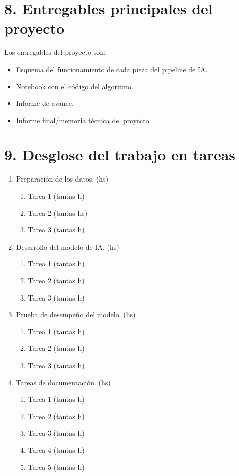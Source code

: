 \documentclass[
11pt, %
codirector, %
]{charter}
\begin{document}
\section{8. Entregables principales del proyecto}
\label{sec:entregables}

Los entregables del proyecto son:

\begin{itemize}
	\item Esquema del funcionamiento de cada pieza del pipeline de IA.
	\item Notebook con el código del algoritmo.
	\item Informe de avance.
	\item Informe final/memoria técnica del proyecto
\end{itemize}

\section{9. Desglose del trabajo en tareas}
\label{sec:wbs}

\begin{enumerate}
\item Preparación de los datos. (hs)
	\begin{enumerate}
	\item Tarea 1 (tantas h)
	\item Tarea 2 (tantas hs)
	\item Tarea 3 (tantas h)
	\end{enumerate}
\item Desarrollo del modelo de IA. (hs)
	\begin{enumerate}
	\item Tarea 1 (tantas h)
	\item Tarea 2 (tantas h)
	\item Tarea 3 (tantas h)
	\end{enumerate}
\item Prueba de desempeño del modelo. (hs)
	\begin{enumerate}
	\item Tarea 1 (tantas h)
	\item Tarea 2 (tantas h)
	\item Tarea 3 (tantas h)
	\end{enumerate}
\item Tareas de documentación. (hs)
	\begin{enumerate}
	\item Tarea 1 (tantas h)
	\item Tarea 2 (tantas h)
	\item Tarea 3 (tantas h)
	\item Tarea 4 (tantas h)
	\item Tarea 5 (tantas h)
	\end{enumerate}
\end{enumerate}
\end{document}

